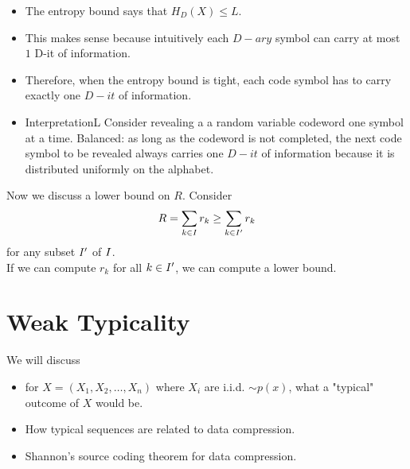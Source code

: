 \documentclass[../main.tex]{subfiles}
\begin{document}
\begin{itemize}
    \item The entropy bound says that $H_D(X)\leq L$. 
    \item This makes sense because intuitively each $D-ary$ symbol can carry at most $1$ D-it of information.
    \item Therefore, when the entropy bound is tight, each code symbol has to carry exactly one $D-it$ of information.
    \item InterpretationL Consider revealing a a random variable codeword one symbol at a time. Balanced: as long as the codeword is not completed, the next code symbol to be revealed always carries one $D-it$ of  information because it is distributed uniformly on the alphabet.
\end{itemize}
Now we discuss a lower bound on $R$. Consider \[
R=\sum_{k\in I}r_k \geq \sum_{k\in I'}r_k
\] for any subset $I'$ of $I$.\\
If we can compute $r_k$ for all $k\in I'$, we can compute a lower bound.


\chapter{Weak Typicality}
We will discuss\begin{itemize}
    \item for $X=(X_1,X_2,\dots,X_n)$ where $X_i$ are i.i.d. $\sim p(x)$, what a "typical" outcome of $X$ would be.
    \item How typical sequences are related to data compression.
    \item Shannon's source coding theorem for data compression.
\end{itemize} 
\end{document}
